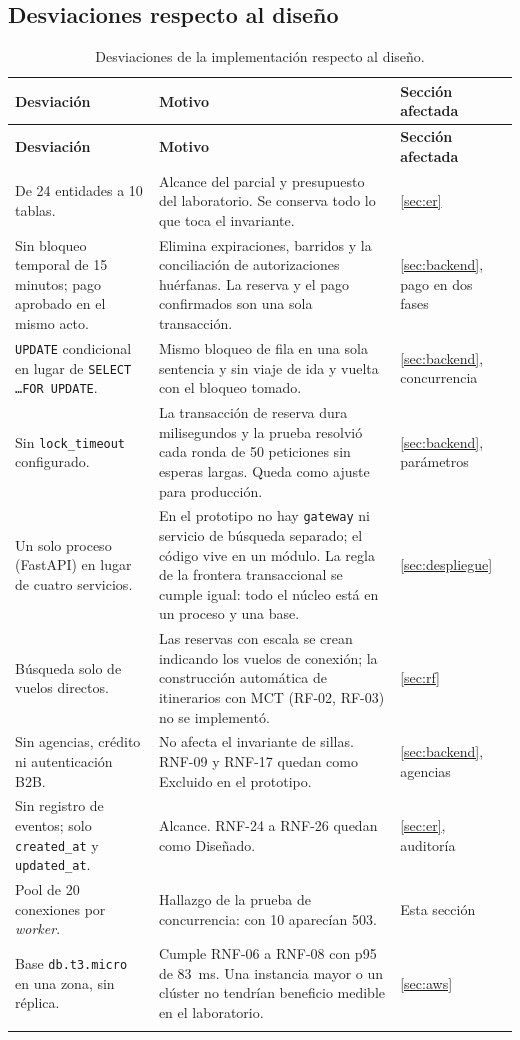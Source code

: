\subsection{Desviaciones respecto al diseño}
\begin{longtable}{@{}L{4.6cm} L{6.6cm} L{4.4cm}@{}}
\toprule \textbf{Desviación} & \textbf{Motivo} & \textbf{Sección afectada} \\ \midrule \endfirsthead
\toprule \textbf{Desviación} & \textbf{Motivo} & \textbf{Sección afectada} \\ \midrule \endhead
De 24 entidades a 10 tablas. & Alcance del parcial y presupuesto del laboratorio. Se conserva todo lo que toca el invariante. & \ref{sec:er} \\
Sin bloqueo temporal de 15 minutos; pago aprobado en el mismo acto. & Elimina expiraciones, barridos y la conciliación de autorizaciones huérfanas. La reserva y el pago confirmados son una sola transacción. & \ref{sec:backend}, pago en dos fases \\
\texttt{UPDATE} condicional en lugar de \texttt{SELECT \ldots FOR UPDATE}. & Mismo bloqueo de fila en una sola sentencia y sin viaje de ida y vuelta con el bloqueo tomado. & \ref{sec:backend}, concurrencia \\
Sin \texttt{lock\_timeout} configurado. & La transacción de reserva dura milisegundos y la prueba resolvió cada ronda de 50 peticiones sin esperas largas. Queda como ajuste para producción. & \ref{sec:backend}, parámetros \\
Un solo proceso (FastAPI) en lugar de cuatro servicios. & En el prototipo no hay \texttt{gateway} ni servicio de búsqueda separado; el código vive en un módulo. La regla de la frontera transaccional se cumple igual: todo el núcleo está en un proceso y una base. & \ref{sec:despliegue} \\
Búsqueda solo de vuelos directos. & Las reservas con escala se crean indicando los vuelos de conexión; la construcción automática de itinerarios con MCT (RF-02, RF-03) no se implementó. & \ref{sec:rf} \\
Sin agencias, crédito ni autenticación B2B. & No afecta el invariante de sillas. RNF-09 y RNF-17 quedan como Excluido en el prototipo. & \ref{sec:backend}, agencias \\
Sin registro de eventos; solo \texttt{created\_at} y \texttt{updated\_at}. & Alcance. RNF-24 a RNF-26 quedan como Diseñado. & \ref{sec:er}, auditoría \\
Pool de 20 conexiones por \emph{worker}. & Hallazgo de la prueba de concurrencia: con 10 aparecían 503. & Esta sección \\
Base \texttt{db.t3.micro} en una zona, sin réplica. & Cumple RNF-06 a RNF-08 con p95 de 83~ms. Una instancia mayor o un clúster no tendrían beneficio medible en el laboratorio. & \ref{sec:aws} \\
\bottomrule
\caption{Desviaciones de la implementación respecto al diseño.}
\end{longtable}

